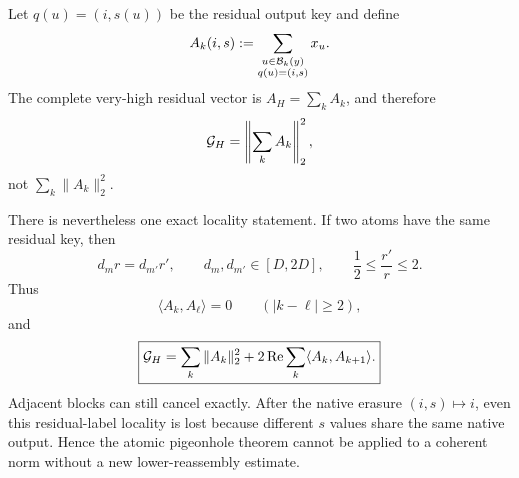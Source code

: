 Let \(q(u)=(i,s(u))\) be the residual output key and define
\begin{equation}
 A_k(i,s)
 :=\sum_{\substack{u\in\mathcal B_k(y)\\q(u)=(i,s)}}x_u.
 \label{eq:tpc59-dyadic-grouped-vector}
\end{equation}
The complete very-high residual vector is \(A_H=\sum_kA_k\), and therefore
\begin{equation}
 \mathcal G_H=\left\|\sum_kA_k\right\|_2^2,
 \label{eq:tpc59-grouped-not-additive}
\end{equation}
not \(\sum_k\|A_k\|_2^2\).

There is nevertheless one exact locality statement.  If two atoms have the
same residual key, then
\begin{equation}
 d_mr=d_{m'}r',
 \qquad d_m,d_{m'}\in[D,2D],
 \qquad \frac12\le\frac{r'}r\le2.
 \label{eq:tpc59-factor-exchange-locality}
\end{equation}
Thus
\begin{equation}
 \langle A_k,A_\ell\rangle=0
 \qquad(|k-\ell|\ge2),
 \label{eq:tpc59-dyadic-orthogonality}
\end{equation}
and
\begin{equation}
 \boxed{
 \mathcal G_H
 =\sum_k\|A_k\|_2^2
  +2\operatorname{Re}\sum_k\langle A_k,A_{k+1}\rangle.}
 \label{eq:tpc59-block-tridiagonal-grouping}
\end{equation}
Adjacent blocks can still cancel exactly.  After the native erasure
\((i,s)\mapsto i\), even this residual-label locality is lost because
different \(s\) values share the same native output.  Hence the atomic
pigeonhole theorem cannot be applied to a coherent norm without a new
lower-reassembly estimate.
